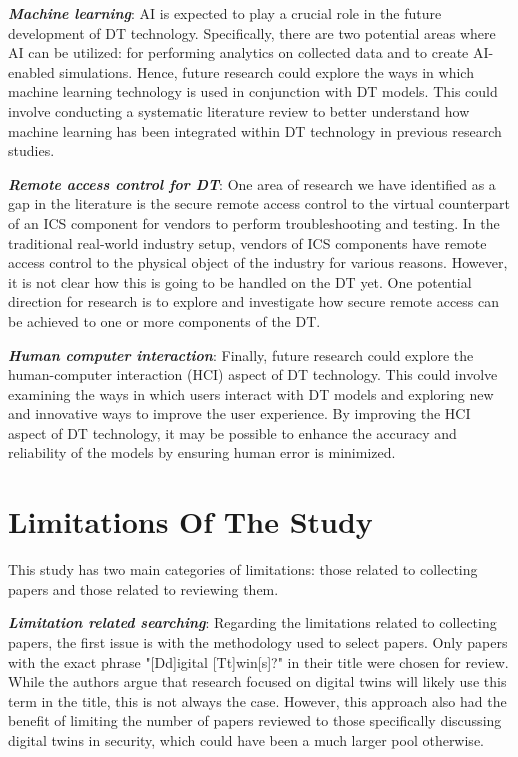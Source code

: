\textbf{\textit{Machine learning}}: AI is expected to play a crucial role in the future development of DT technology. Specifically, there are two potential areas where AI can be utilized: for performing analytics on collected data and to create AI-enabled simulations. Hence, future research could explore the ways in which machine learning technology is used in conjunction with DT models. This could involve conducting a systematic literature review to better understand how machine learning has been integrated within DT technology in previous research studies.

\textbf{\textit{Remote access control for DT}}: One area of research we have identified as a gap in the literature is the secure remote access control to the virtual counterpart of an ICS component for vendors to perform troubleshooting and testing. In the traditional real-world industry setup, vendors of ICS components have remote access control to the physical object of the industry for various reasons. However, it is not clear how this is going to be handled on the DT yet. One potential direction for research is to explore and investigate how secure remote access can be achieved to one or more components of the DT.

\textbf{\textit{Human computer interaction}}: Finally, future research could explore the human-computer interaction (HCI) aspect of DT technology. This could involve examining the ways in which users interact with DT models and exploring new and innovative ways to improve the user experience. By improving the HCI aspect of DT technology, it may be possible to enhance the accuracy and reliability of the models by ensuring human error is minimized.

\section{Limitations Of The Study}
% 
This study has two main categories of limitations: those related to collecting papers and those related to reviewing them.

\textbf{\textit{Limitation related searching}}: Regarding the limitations related to collecting papers, the first issue is with the methodology used to select papers. Only papers with the exact phrase "[Dd]igital [Tt]win[s]?" in their title were chosen for review. While the authors argue that research focused on digital twins will likely use this term in the title, this is not always the case. However, this approach also had the benefit of limiting the number of papers reviewed to those specifically discussing digital twins in security, which could have been a much larger pool otherwise. 

